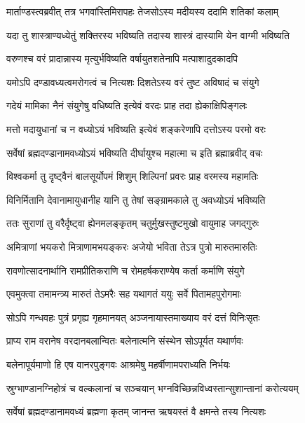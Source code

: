 \twolineshloka
{मार्ताण्डस्त्वब्रवीत् तत्र भगवांस्तिमिरापहः}
{तेजसोऽस्य मदीयस्य ददामि शतिकां कलाम्} %

\twolineshloka
{यदा तु शास्त्राण्यध्येतुं शक्तिरस्य भविष्यति}
{तदास्य शास्त्रं दास्यामि येन वाग्मी भविष्यति} %

\twolineshloka
{वरुणश्च वरं प्रादान्नास्य मृत्युर्भविष्यति}
{वर्षायुतशतेनापि मत्पाशादुदकादपि} %

\twolineshloka
{यमोऽपि दण्डावध्यत्वमरोगत्वं च नित्यशः}
{दिशतेऽस्य वरं तुष्ट अविषादं च संयुगे} %

\twolineshloka
{गदेयं मामिका नैनं संयुगेषु वधिष्यति}
{इत्येवं वरदः प्राह तदा ह्येकाक्षिपिङ्गलः} %

\twolineshloka
{मत्तो मदायुधानां च न वध्योऽयं भविष्यति}
{इत्येवं शङ्करेणापि दत्तोऽस्य परमो वरः} %

\twolineshloka
{सर्वेषां ब्रह्मदण्डानामवध्योऽयं भविष्यति}
{दीर्घायुश्च महात्मा च इति ब्रह्माब्रवीद् वचः} %

\twolineshloka
{विश्वकर्मा तु दृष्ट्वैनं बालसूर्योपमं शिशुम्}
{शिल्पिनां प्रवरः प्राह वरमस्य महामतिः} %

\twolineshloka
{विनिर्मितानि देवानामायुधानीह यानि तु}
{तेषां सङ्ग्रामकाले तु अवध्योऽयं भविष्यति} %

\twolineshloka
{ततः सुराणां तु वरैर्दृष्ट्वा ह्येनमलङ्कृतम्}
{चतुर्मुखस्तुष्टमुखो वायुमाह जगद्गुरुः} %

\twolineshloka
{अमित्राणां भयकरो मित्राणामभयङ्करः}
{अजेयो भविता तेऽत्र पुत्रो मारुतमारुतिः} %

\twolineshloka
{रावणोत्सादनार्थानि रामप्रीतिकराणि च}
{रोमहर्षकराण्येष कर्ता कर्माणि संयुगे} %

\twolineshloka
{एवमुक्त्वा तमामन्त्र्य मारुतं तेऽमरैः सह}
{यथागतं ययुः सर्वे पितामहपुरोगमाः} %

\twolineshloka
{सोऽपि गन्धवहः पुत्रं प्रगृह्य गृहमानयत्}
{अञ्जनायास्तमाख्याय वरं दत्तं विनिःसृतः} %

\twolineshloka
{प्राप्य राम वरानेष वरदानबलान्वितः}
{बलेनात्मनि संस्थेन सोऽपूर्यत यथार्णवः} %

\twolineshloka
{बलेनापूर्यमाणो हि एष वानरपुङ्गवः}
{आश्रमेषु महर्षीणामपराध्यति निर्भयः} %

\twolineshloka
{स्रुग्भाण्डानग्निहोत्रं च वल्कलानां च सञ्चयान्}
{भग्नविच्छिन्नविध्वस्तान्सुशान्तानां करोत्ययम्} %

\twolineshloka
{सर्वेषां ब्रह्मदण्डानामवध्यं ब्रह्मणा कृतम्}
{जानन्त ऋषयस्तं वै क्षमन्ते तस्य नित्यशः} %

